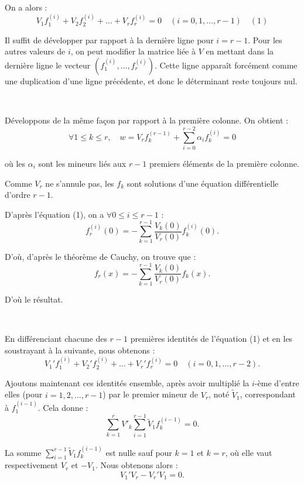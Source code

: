 On a alors :
\[ V_1 f_1^{(i)} + V_2 f_2^{(i)} + \ldots + V_r f_r^{(i)} = 0 \quad (i = 0, 1,
   \ldots, r - 1) \quad (1) \]


Il suffit de d{\'e}velopper par rapport {\`a} la derni{\`e}re ligne pour $i =
r - 1$. Pour les autres valeurs de $i$, on peut modifier la matrice li{\'e}e
{\`a} $V$ en mettant dans la derni{\`e}re ligne le vecteur $(f_1^{(i)},
\ldots, f_r^{(i)})$. Cette ligne appara{\^i}t forc{\'e}ment comme une
duplication d'une ligne pr{\'e}c{\'e}dente, et donc le d{\'e}terminant reste
toujours nul.

\

D{\'e}veloppons de la m{\^e}me fa{\c c}on par rapport {\`a} la premi{\`e}re
colonne. On obtient :
\[ \forall 1 \leq k \leq r, \quad w = V_r f_k^{(r - 1)} + \sum_{i = 0}^{r - 2}
   \alpha_i f_k^{(i)} = 0 \]


o{\`u} les $\alpha_i$ sont les mineurs li{\'e}s aux $r - 1$ premiers
{\'e}l{\'e}ments de la premi{\`e}re colonne.

Comme $V_r$ ne s'annule pas, les $f_k$ sont solutions d'une {\'e}quation
diff{\'e}rentielle d'ordre $r - 1$.

D'apr{\`e}s l'{\'e}quation (1), on a $\forall 0 \leq i \leq r - 1$ :
\[ f_r^{(i)} (0) = - \sum_{k = 1}^{r - 1} \frac{V_k (0)}{V_r (0)} f_k^{(i)}
   (0) . \]


D'o{\`u}, d'apr{\`e}s le th{\'e}or{\`e}me de Cauchy, on trouve que :
\[ f_r (x) = - \sum_{k = 1}^{r - 1} \frac{V_k (0)}{V_r (0)} f_k (x) . \]


D'o{\`u} le r{\'e}sultat.

\


En diff{\'e}renciant chacune des $r - 1$ premi{\`e}res identit{\'e}s de
l'{\'e}quation (1) et en les soustrayant {\`a} la suivante, nous obtenons :
\[ V_1' f_1^{(i)} + V_2' f_2^{(i)} + \ldots + V_r' f_r^{(i)} = 0 \quad (i = 0,
   1, \ldots, r - 2) . \]


Ajoutons maintenant ces identit{\'e}s ensemble, apr{\`e}s avoir multipli{\'e}
la $i$-{\`e}me d'entre elles (pour $i = 1, 2, \ldots, r - 1$) par le premier
mineur de $V_r$, not{\'e} $\tilde{V}_1$, correspondant {\`a} $f_1^{(i - 1)}$.
Cela donne :
\[ \sum_{k = 1}^r V'_k  \sum_{i = 1}^{r - 1} \tilde{V}_1 f_k^{(i - 1)} = 0. \]


La somme $\sum_{i = 1}^{r - 1} \tilde{V}_1 f_k^{(i - 1)}$ est nulle sauf pour
$k = 1$ et $k = r$, o{\`u} elle vaut respectivement $V_r$ et $- V_1$. Nous
obtenons alors :
\[ V_1' V_r - V_r' V_1 = 0. \]


